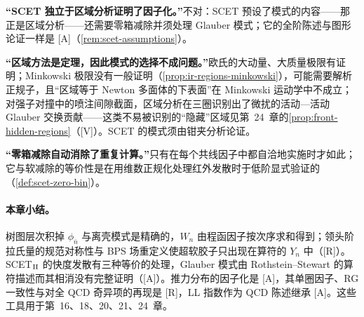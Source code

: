 \begin{tcolorbox}[enhanced,breakable,title=常见误解,fonttitle=\bfseries,
  colback=gray!3!white,colframe=gray!55!black,boxrule=0.6pt,arc=2pt,
  left=5pt,right=5pt,top=3pt,bottom=3pt,before skip=6pt,after skip=6pt]
\textbf{“SCET 独立于区域分析证明了因子化。”}不对：SCET 预设了模式的内容——那正是区域分析——还需要零箱减除并须处理 Glauber 模式；它的全阶陈述与图形论证一样是 [A]（\cref{rem:scet-assumptions}）。\par
\textbf{“区域方法是定理，因此模式的选择不成问题。”}欧氏的大动量、大质量极限有证明\cite{Smirnov:1990rz}；Minkowski 极限没有一般证明（\cref{prop:ir-regions-minkowski}），可能需要解析正规子，且“区域等于 Newton 多面体的下表面”在 Minkowski 运动学中不成立\cite{Gardi:2024axt}；对强子对撞中的喷注间隙截面，区域分析在三圈识别出了微扰的活动—活动 Glauber 交换贡献\cite{Becher:2024kmk}——这类不易被识别的“隐藏”区域见第~24~章的\cref{prop:front-hidden-regions}（[V]）。SCET 的模式须由钳夹分析论证。\par
\textbf{“零箱减除自动消除了重复计算。”}只有在每个共线因子中都自洽地实施时才如此；它与软减除的等价性是在用维数正规化处理红外发散时于低阶显式验证的（\cref{def:scet-zero-bin}）。
\end{tcolorbox}

\paragraph{本章小结。}
树图层次积掉 $\phi_{\bar n}$ 与离壳模式是精确的，$W_n$ 由程函因子按次序求和得到；领头阶拉氏量的规范对称性与 BPS 场重定义使超软胶子只出现在算符的 $Y_n$ 中（[R]）。SCET$_{\rm II}$ 的快度发散有三种等价的处理，Glauber 模式由 Rothstein--Stewart 的算符描述而其相消没有完整证明（[A]）。推力分布的因子化是 [A]，其单圈因子、RG 一致性与对全 QCD 奇异项的再现是 [R]，LL 指数作为 QCD 陈述继承 [A]。这些工具用于第~16、18、20、21、24~章。

